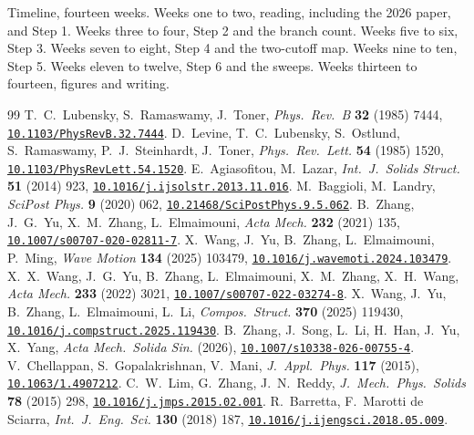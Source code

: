 \documentclass[11pt]{article}
\newcommand{\doi}[1]{\href{https://doi.org/#1}{\texttt{#1}}}
\begin{document}
Timeline, fourteen weeks. Weeks one to two, reading, including the 2026 paper, and Step 1. Weeks three to
four, Step 2 and the branch count. Weeks five to six, Step 3. Weeks seven to eight, Step 4
and the two-cutoff map. Weeks nine to ten, Step 5. Weeks eleven to twelve, Step 6 and the sweeps. Weeks
thirteen to fourteen, figures and writing.

\begin{thebibliography}{99}
\small
{} T.~C.~Lubensky, S.~Ramaswamy, J.~Toner, \emph{Phys.\ Rev.\ B} \textbf{32} (1985) 7444, \doi{10.1103/PhysRevB.32.7444}.
 D.~Levine, T.~C.~Lubensky, S.~Ostlund, S.~Ramaswamy, P.~J.~Steinhardt, J.~Toner, \emph{Phys.\ Rev.\ Lett.} \textbf{54} (1985) 1520, \doi{10.1103/PhysRevLett.54.1520}.
 E.~Agiasofitou, M.~Lazar, \emph{Int.\ J.\ Solids Struct.} \textbf{51} (2014) 923, \doi{10.1016/j.ijsolstr.2013.11.016}.
 M.~Baggioli, M.~Landry, \emph{SciPost Phys.} \textbf{9} (2020) 062, \doi{10.21468/SciPostPhys.9.5.062}.
 B.~Zhang, J.~G.~Yu, X.~M.~Zhang, L.~Elmaimouni, \emph{Acta Mech.} \textbf{232} (2021) 135, \doi{10.1007/s00707-020-02811-7}.
 X.~Wang, J.~Yu, B.~Zhang, L.~Elmaimouni, P.~Ming, \emph{Wave Motion} \textbf{134} (2025) 103479, \doi{10.1016/j.wavemoti.2024.103479}.
 X.~X.~Wang, J.~G.~Yu, B.~Zhang, L.~Elmaimouni, X.~M.~Zhang, X.~H.~Wang, \emph{Acta Mech.} \textbf{233} (2022) 3021, \doi{10.1007/s00707-022-03274-8}.
 X.~Wang, J.~Yu, B.~Zhang, L.~Elmaimouni, L.~Li, \emph{Compos.\ Struct.} \textbf{370} (2025) 119430, \doi{10.1016/j.compstruct.2025.119430}.
 B.~Zhang, J.~Song, L.~Li, H.~Han, J.~Yu, X.~Yang, \emph{Acta Mech.\ Solida Sin.} (2026), \doi{10.1007/s10338-026-00755-4}.
 V.~Chellappan, S.~Gopalakrishnan, V.~Mani, \emph{J.\ Appl.\ Phys.} \textbf{117} (2015), \doi{10.1063/1.4907212}.
 C.~W.~Lim, G.~Zhang, J.~N.~Reddy, \emph{J.\ Mech.\ Phys.\ Solids} \textbf{78} (2015) 298, \doi{10.1016/j.jmps.2015.02.001}.
 R.~Barretta, F.~Marotti de Sciarra, \emph{Int.\ J.\ Eng.\ Sci.} \textbf{130} (2018) 187, \doi{10.1016/j.ijengsci.2018.05.009}.
\end{thebibliography}
\end{document}
